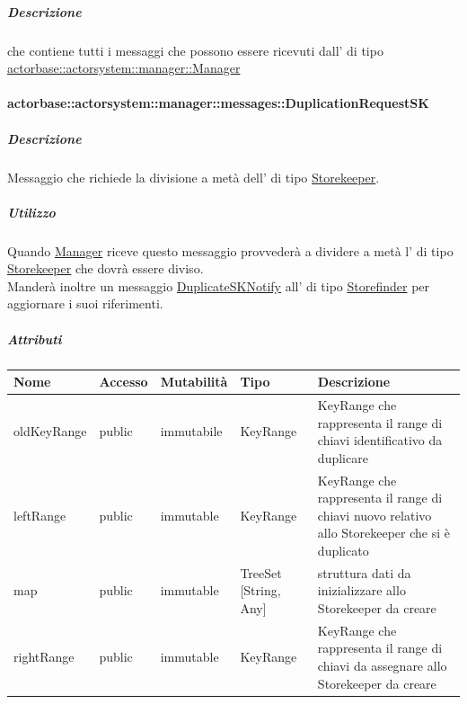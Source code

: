\documentclass{scalatekids-article}
\begin{document}
\subparagraph{Descrizione}
 che contiene tutti i messaggi che possono essere ricevuti
dall' di tipo
\hyperref[sec:actorbase::actorsystem::manager::Manager]{actorbase::\allowbreak{}actorsystem::\allowbreak{}manager::\allowbreak{}Manager}

\paragraph{actorbase::actorsystem::manager::messages::DuplicationRequestSK}
\label{sec:actorbase::actorsystem::manager::messages::DuplicationRequestSK}

\subparagraph{Descrizione}

Messaggio che richiede la divisione a metà dell' di tipo
\hyperref[sec:actorbase::actorsystem::storekeeper::Storekeeper]{Storekeeper}.

\subparagraph{Utilizzo}

Quando \hyperref[sec:actorbase::actorsystem::manager::Manager]{Manager}
riceve questo messaggio provvederà a dividere a metà l' di tipo
\hyperref[sec:actorbase::actorsystem::storekeeper::Storekeeper]{Storekeeper}
che dovrà essere diviso.\\Manderà inoltre un messaggio \hyperref[sec:actorbase::actorsystem::storefinder::messages::DuplicateSKNotify]{DuplicateSKNotify} all' di tipo
\hyperref[sec:actorbase::actorsystem::storefinder::Storefinder]{Storefinder}
per aggiornare i suoi riferimenti.

\subparagraph{Attributi}
\begin{tabular}{| p{3cm} | p{1.5cm} | p{2cm} | p{2cm} | p{8.5cm} |}
  \hline
  Nome & Accesso & Mutabilità & Tipo & Descrizione\\
  \hline
  oldKeyRange & public & immutabile & KeyRange & KeyRange che rappresenta il range di chiavi identificativo da duplicare\\
  \hline
  leftRange & public & immutable & KeyRange & KeyRange che rappresenta il range di chiavi nuovo relativo allo Storekeeper che si è duplicato\\
  \hline
  map & public & immutable & TreeSet [String, Any] & struttura dati da inizializzare allo Storekeeper da creare\\
  \hline
  rightRange & public & immutable & KeyRange & KeyRange che rappresenta il range di chiavi da assegnare allo Storekeeper da creare\\
  \hline
\end{tabular}
\end{document}
